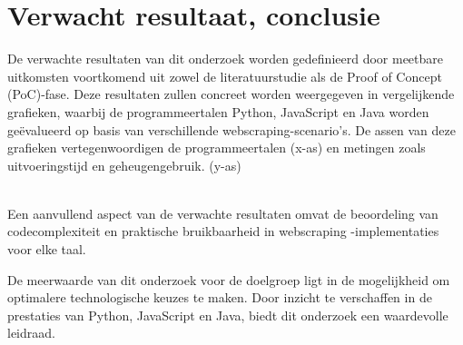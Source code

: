 \section{Verwacht resultaat, conclusie}%
\label{sec:verwachte_resultaten}
De verwachte resultaten van dit onderzoek worden gedefinieerd door meetbare uitkomsten voortkomend uit zowel de literatuurstudie 
als de Proof of Concept (PoC)-fase. Deze resultaten zullen concreet worden weergegeven in vergelijkende grafieken, waarbij de 
programmeertalen Python, JavaScript en Java worden geëvalueerd op basis van verschillende webscraping-scenario's. 
De assen van deze grafieken vertegenwoordigen de programmeertalen (x-as) en metingen zoals uitvoeringstijd en geheugengebruik. (y-as)
\\
\\
  
Een aanvullend aspect van de verwachte resultaten omvat de beoordeling van codecomplexiteit en praktische bruikbaarheid in webscraping
-implementaties voor elke taal.

De meerwaarde van dit onderzoek voor de doelgroep ligt in de mogelijkheid om optimalere technologische keuzes te maken. 
Door inzicht te verschaffen in de prestaties van Python, JavaScript en Java, biedt dit onderzoek een waardevolle leidraad. 